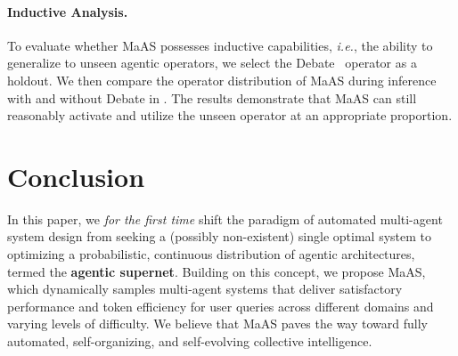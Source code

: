 \documentclass{article}
\theoremstyle{plain}
\theoremstyle{definition}
\theoremstyle{remark}
\newcommand{\ourmethod}{{{MaAS}}\xspace}
\begin{document}
\paragraph{Inductive Analysis.} To evaluate whether \ourmethod possesses inductive capabilities, \textit{i.e.}, the ability to generalize to unseen agentic operators, we select the Debate~\cite{arXiv2023_MultiAgent-Debate} operator as a holdout. We then compare the operator distribution of \ourmethod during inference with and without Debate in . The results demonstrate that \ourmethod can still reasonably activate and utilize the unseen operator at an appropriate proportion.

\vspace{-0.4em}
\section{Conclusion}
\vspace{-0.4em}
In this paper, we \textit{for the first time} shift the paradigm of automated multi-agent system design from seeking a (possibly non-existent) single optimal system to optimizing a probabilistic, continuous distribution of agentic architectures, termed the \textbf{agentic supernet}. Building on this concept, we propose \ourmethod, which dynamically samples multi-agent systems that deliver satisfactory performance and token efficiency for user queries across different domains and varying levels of difficulty. %
We believe that \ourmethod paves the way toward fully automated, self-organizing, and self-evolving collective intelligence.
\end{document}
